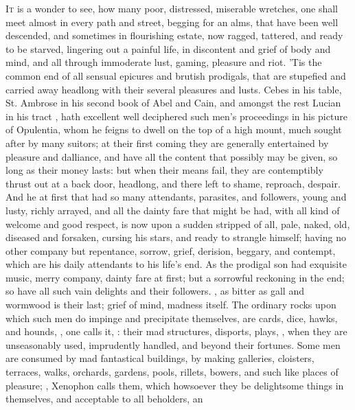 \lettrine{I}{t} is a wonder to see, how many poor, distressed, miserable
wretches, one shall meet almost in every path and street, begging for an alms,
that have been well descended, and sometimes in flourishing estate, now ragged,
tattered, and ready to be starved, lingering out a painful life, in discontent
and grief of body and mind, and all through immoderate lust, gaming, pleasure
and riot. 'Tis the common end of all sensual epicures and brutish prodigals,
that are stupefied and carried away headlong with their several pleasures and
lusts. Cebes in his table, St. Ambrose in his second book of Abel and Cain, and
amongst the rest Lucian in his tract , hath excellent well deciphered such men's proceedings in his
picture of Opulentia, whom he feigns to dwell on the top of a high mount, much
sought after by many suitors; at their first coming they are generally
entertained by pleasure and dalliance, and have all the content that possibly
may be given, so long as their money lasts: but when their means fail, they are
contemptibly thrust out at a back door, headlong, and there left to shame,
reproach, despair. And he at first that had so many attendants, parasites, and
followers, young and lusty, richly arrayed, and all the dainty fare that might
be had, with all kind of welcome and good respect, is now upon a sudden
stripped of all, pale, naked, old, diseased and forsaken,
cursing his stars, and ready to strangle himself; having no other company but
repentance, sorrow, grief, derision, beggary, and contempt, which are his daily
attendants to his life's end. As the prodigal son had
exquisite music, merry company, dainty fare at first; but a sorrowful reckoning
in the end; so have all such vain delights and their followers.
, as bitter as gall and wormwood is their
last; grief of mind, madness itself. The ordinary rocks upon which such men do
impinge and precipitate themselves, are cards, dice, hawks, and hounds,
, one calls it, : their
mad structures, disports, plays, \etc{}, when they are unseasonably used,
imprudently handled, and beyond their fortunes. Some men are consumed by mad
fantastical buildings, by making galleries, cloisters, terraces, walks,
orchards, gardens, pools, rillets, bowers, and such like places of pleasure;
, Xenophon calls them, which howsoever
they be delightsome things in themselves, and acceptable to all beholders, an
